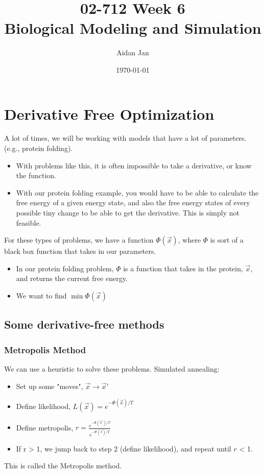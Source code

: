 \documentclass[10pt]{article}
\title{02-712 Week 6 \\ \large{Biological Modeling and Simulation}}
\author{Aidan Jan}
\date{\today}
\begin{document}
\maketitle

\section*{Derivative Free Optimization}
A lot of times, we will be working with models that have a lot of parameters.  (e.g., protein folding). 
\begin{itemize}
	\item With problems like this, it is often impossible to take a derivative, or know the function.
	\item With our protein folding example, you would have to be able to calculate the free energy of a given energy state, and also the free energy states of every possible tiny change to be able to get the derivative.  This is simply not feasible.
\end{itemize}
For these types of problems, we have a function $\Phi(\vec{x})$, where $\Phi$ is sort of a black box function that takes in our parameters.
\begin{itemize}
	\item In our protein folding problem, $\Phi$ is a function that takes in the protein, $\vec{x}$, and returns the current free energy.
	\item We want to find $\min \Phi(\vec{x})$
\end{itemize}

\subsection*{Some derivative-free methods}
\subsubsection*{Metropolis Method}
We can use a heuristic to solve these problems.  Simulated annealing:
\begin{itemize}
	\item Set up some "moves", $\vec{x} \rightarrow \vec{x}'$
	\item Define likelihood, $L(\vec{x}) = e^{-\Phi(\vec{x})/T}$
	\item Define metropolis, $r = \frac{e^{-\Phi(\vec{x}') / T}}{e^{-\Phi(\vec{x}) / T}}$
	\item If r > 1, we jump back to step 2 (define likelihood), and repeat until $r$ < 1.
\end{itemize}
This is called the Metropolis method.
\end{document}

